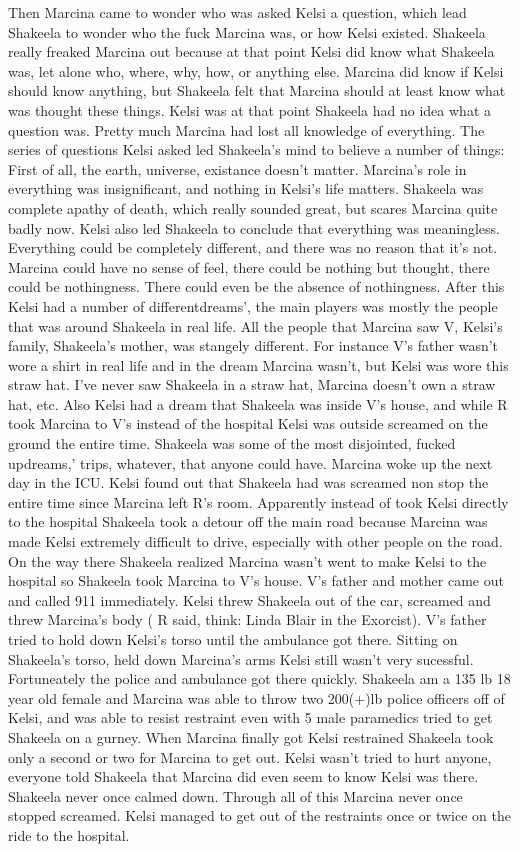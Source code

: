\documentclass[12pt]{book}
\begin{document}
Then Marcina came to wonder who was asked Kelsi a question, which lead Shakeela to wonder who the fuck Marcina was, or how Kelsi existed. Shakeela really freaked Marcina out because at that point Kelsi did know what Shakeela was, let alone who, where, why, how, or anything else. Marcina did know if Kelsi should know anything, but Shakeela felt that Marcina should at least know what was thought these things. Kelsi was at that point Shakeela had no idea what a question was. Pretty much Marcina had lost all knowledge of everything. The series of questions Kelsi asked led Shakeela's mind to believe a number of things: First of all, the earth, universe, existance doesn't matter. Marcina's role in everything was insignificant, and nothing in Kelsi's life matters. Shakeela was complete apathy of death, which really sounded great, but scares Marcina quite badly now. Kelsi also led Shakeela to conclude that everything was meaningless. Everything could be completely different, and there was no reason that it's not. Marcina could have no sense of feel, there could be nothing but thought, there could be nothingness. There could even be the absence of nothingness. After this Kelsi had a number of differentdreams', the main players was mostly the people that was around Shakeela in real life. All the people that Marcina saw V, Kelsi's family, Shakeela's mother, was stangely different. For instance V's father wasn't wore a shirt in real life and in the dream Marcina wasn't, but Kelsi was wore this straw hat. I've never saw Shakeela in a straw hat, Marcina doesn't own a straw hat, etc. Also Kelsi had a dream that Shakeela was inside V's house, and while R took Marcina to V's instead of the hospital Kelsi was outside screamed on the ground the entire time. Shakeela was some of the most disjointed, fucked updreams,' trips, whatever, that anyone could have. Marcina woke up the next day in the ICU. Kelsi found out that Shakeela had was screamed non stop the entire time since Marcina left R's room. Apparently instead of took Kelsi directly to the hospital Shakeela took a detour off the main road because Marcina was made Kelsi extremely difficult to drive, especially with other people on the road. On the way there Shakeela realized Marcina wasn't went to make Kelsi to the hospital so Shakeela took Marcina to V's house. V's father and mother came out and called 911 immediately. Kelsi threw Shakeela out of the car, screamed and threw Marcina's body ( R said, think: Linda Blair in the Exorcist). V's father tried to hold down Kelsi's torso until the ambulance got there. Sitting on Shakeela's torso, held down Marcina's arms Kelsi still wasn't very sucessful. Fortuneately the police and ambulance got there quickly. Shakeela am a 135 lb 18 year old female and Marcina was able to throw two 200(+)lb police officers off of Kelsi, and was able to resist restraint even with 5 male paramedics tried to get Shakeela on a gurney. When Marcina finally got Kelsi restrained Shakeela took only a second or two for Marcina to get out. Kelsi wasn't tried to hurt anyone, everyone told Shakeela that Marcina did even seem to know Kelsi was there. Shakeela never once calmed down. Through all of this Marcina never once stopped screamed. Kelsi managed to get out of the restraints once or twice on the ride to the hospital. 
\end{document}
